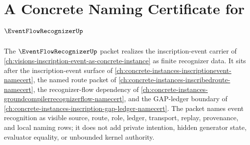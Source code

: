 \chapter{A Concrete Naming Certificate for $\EventFlowRecognizerUp$}
\label{ch:concrete-instances-event-flow-recognizer-namecert}

The $\EventFlowRecognizerUp$ packet realizes the inscription-event carrier of \autoref{ch:visions-inscription-event-as-concrete-instance} as finite recognizer data. It sits after the inscription-event surface of \autoref{ch:concrete-instances-inscriptionevent-namecert}, the named route packet of \autoref{ch:concrete-instances-inscribedroute-namecert}, the recognizer-flow dependency of \autoref{ch:concrete-instances-groundcompilerrecognizerflow-namecert}, and the GAP-ledger boundary of \autoref{ch:concrete-instances-inscription-gap-ledger-namecert}. The packet names event recognition as visible source, route, role, ledger, transport, replay, provenance, and local naming rows; it does not add private intention, hidden generator state, evaluator equality, or unbounded kernel authority.

